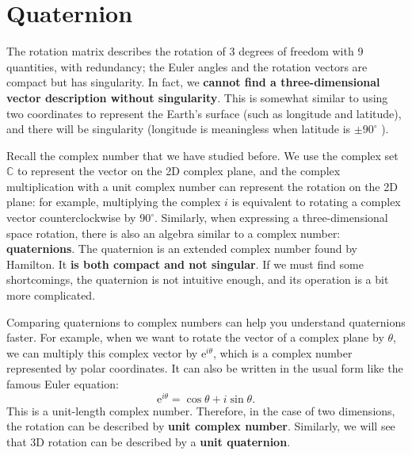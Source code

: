 \section{Quaternion}

The rotation matrix describes the rotation of 3 degrees of freedom with 9 quantities, with redundancy; the Euler angles and the rotation vectors are compact but has singularity. In fact, we \textbf{cannot find a three-dimensional vector description without singularity}\cite{Stuelpnagel1964}. This is somewhat similar to using two coordinates to represent the Earth's surface (such as longitude and latitude), and there will be singularity (longitude is meaningless when latitude is $ \pm  90 ^ \circ $ ).

Recall the complex number that we have studied before. We use the complex set $ \mathbb {C} $ to represent the vector on the 2D complex plane, and the complex multiplication with a unit complex number can represent the rotation on the 2D plane: for example, multiplying the complex $i$ is equivalent to rotating a complex vector counterclockwise by $ 90 ^ \circ $. Similarly, when expressing a three-dimensional space rotation, there is also an algebra similar to a complex number: \textbf{quaternions}. The quaternion is an extended complex number found by Hamilton. It \textbf{ is both compact and not singular}. If we must find some shortcomings, the quaternion is not intuitive enough, and its operation is a bit more complicated.

Comparing quaternions to complex numbers can help you understand quaternions faster. For example, when we want to rotate the vector of a complex plane by $\theta$, we can multiply this complex vector by $\mathrm{e}^{i \theta}$, which is a complex number represented by polar coordinates. It can also be written in the usual form like the famous Euler equation:
\begin{equation}
\mathrm{e}^{i\theta} = \cos \theta + i \sin \theta.
\end{equation}
This is a unit-length complex number. Therefore, in the case of two dimensions, the rotation can be described by \textbf{unit complex number}. Similarly, we will see that 3D rotation can be described by a \textbf{unit quaternion}.

